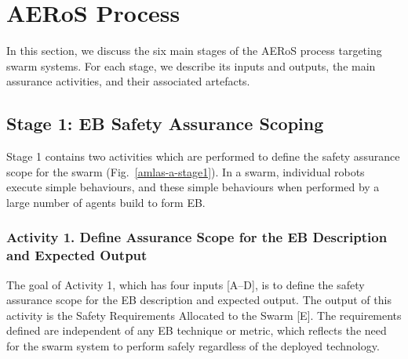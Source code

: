 \documentclass[runningheads]{llncs}
\begin{document}
\vspace{-2ex}
\section{AERoS Process}\label{framework}
\vspace{-2ex}
In this section, we discuss the six main stages of the AERoS process targeting swarm systems. For each stage, we describe its inputs and outputs, the main assurance activities, and their associated artefacts.
%

\vspace{-2ex}
\subsection{Stage 1: EB Safety Assurance Scoping} \label{framework-stage1}
Stage 1 contains two activities which are performed to define the safety assurance scope for the swarm (Fig.~\ref{amlas-a-stage1}). In a swarm, individual robots execute simple behaviours, and these simple behaviours when performed by a large number of agents build to form EB.  
\vspace{-2ex}
\subsubsection*{Activity 1. Define Assurance Scope for the EB Description and Expected Output}
The goal of Activity 1, which has four inputs [A--D], is to define the safety assurance scope for the EB description and expected output. 
The output of this activity is the Safety Requirements Allocated to the Swarm [E]. The requirements defined are independent of any EB technique or metric, which reflects the need for the swarm system to perform safely regardless of the deployed technology.
\end{document}
